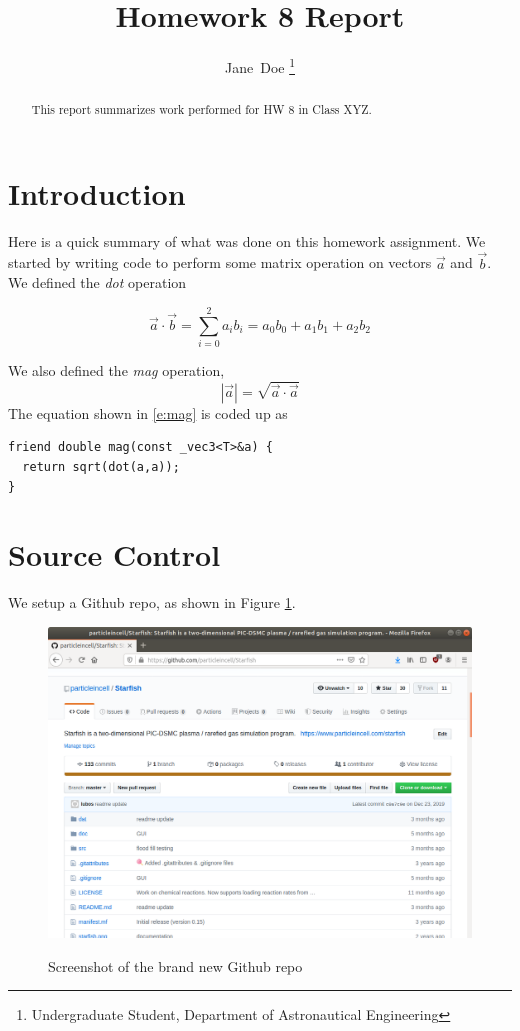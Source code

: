 \documentclass[%
]{IEEEtran}
\begin{document}
\title{Homework 8 Report}
\author{Jane~Doe%
\thanks{Undergraduate Student, Department of Astronautical Engineering}%
}
%
\maketitle

\begin{abstract}
This report summarizes work performed for HW 8 in Class XYZ.
\end{abstract}

\section{Introduction}
Here is a quick summary of what was done on this homework assignment. We started by writing code to perform some matrix operation on vectors $\vec{a}$ and $\vec{b}$. We defined the \emph{dot} operation

\begin{equation}
\vec{a}\cdot\vec{b} = \sum_{i=0}^2 a_i b_i = a_0b_0 + a_1b_1 + a_2b_2
\end{equation}

We also defined the \emph{mag} operation,
\begin{equation}
\left|\vec{a}\right| = \sqrt{\vec{a}\cdot\vec{a}}
\label{e:mag}
\end{equation}
The equation shown in \ref{e:mag} is coded up as

\begin{lstlisting}
friend double mag(const _vec3<T>&a) {
  return sqrt(dot(a,a));
}
\end{lstlisting}

\section{Source Control}
We setup a Github repo, as shown in Figure \ref{f:repo}.

\begin{figure}[h]
\centering
{\includegraphics[width=0.8\linewidth]{github}}  %
\caption{Screenshot of the brand new Github repo}
\label{f:repo}
\end{figure}
\end{document}
